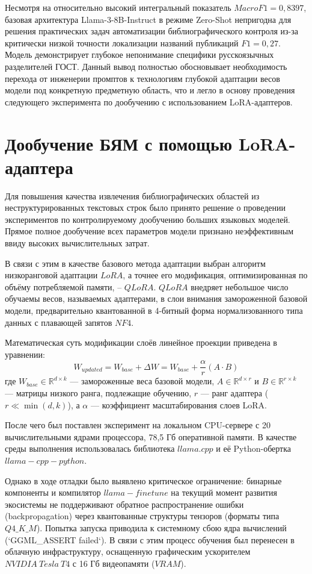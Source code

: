 Несмотря на относительно высокий интегральный показатель $MacroF1 = 0,8397$, базовая архитектура Llama-3-8B-Instruct в режиме Zero-Shot непригодна для решения практических задач автоматизации библиографического контроля из-за критически низкой точности локализации названий публикаций $F1 = 0,27$. Модель демонстрирует глубокое непонимание специфики русскоязычных разделителей ГОСТ. Данный вывод полностью обосновывает необходимость перехода от инженерии промптов к технологиям глубокой адаптации весов модели под конкретную предметную область, что и легло в основу проведения следующего эксперимента по дообучению с использованием LoRA-адаптеров.

\section{Дообучение БЯМ с помощью LoRA-адаптера}
Для повышения качества извлечения библиографических областей из неструктурированных текстовых строк было принято решение о проведении экспериментов по контролируемому дообучению больших языковых моделей. Прямое полное дообучение всех параметров модели признано неэффективным ввиду высоких вычислительных затрат.

В связи с этим в качестве базового метода адаптации выбран алгоритм низкоранговой адаптации $LoRA$, а точнее его модификация, оптимизированная по объёму потребляемой памяти, -- $QLoRA$. $QLoRA$ внедряет небольшое число обучаемы весов, называемых адаптерами, в слои внимания замороженной базовой модели, предварительно квантованной в 4-битный форма нормализованного типа данных с плавающей запятов $NF4$.

Математическая суть модификации слоёв линейное проекции приведена в уравнении:
\begin{equation}
    W_{updated} = W_{base} + \Delta W = W_{base} + \frac{\alpha}{r} (A \cdot B)
\end{equation}
где $W_{base} \in \mathbb{R}^{d \times k}$ — замороженные веса базовой модели, $A \in \mathbb{R}^{d \times r}$ и $B \in \mathbb{R}^{r \times k}$ — матрицы низкого ранга, подлежащие обучению, $r$ — ранг адаптера ($r \ll \min(d,k)$), а $\alpha$ — коэффициент масштабирования слоев LoRA.

После чего был поставлен эксперимент на локальном CPU-сервере с 20 вычислительными ядрами процессора, 78,5 Гб оперативной памяти. В качестве среды выполнения использовалась библиотека $llama.cpp$ и её Python-обертка $llama-cpp-python$.

Однако в ходе отладки было выявлено критическое ограничение: бинарные компоненты и компилятор $llama-finetune$ на текущий момент развития экосистемы не поддерживают обратное распространение ошибки (backpropagation) через квантованные структуры тензоров (форматы типа $Q4\_K\_M$). Попытка запуска приводила к системному сбою ядра вычислений (`GGML\_ASSERT failed`). В связи с этим процесс обучения был перенесен в облачную инфраструктуру, оснащенную графическим ускорителем $NVIDIA\ Tesla\ T4$ с 16 Гб видеопамяти ($VRAM$).

